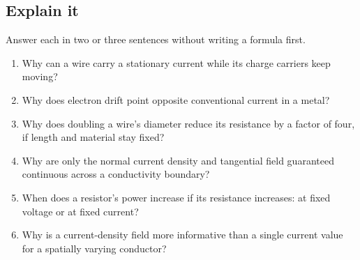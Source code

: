 \documentclass[11pt]{article}
\begin{document}
\begin{keepsection}
\section{Explain it}

Answer each in two or three sentences without writing a formula first.

\begin{enumerate}
\item Why can a wire carry a stationary current while its charge carriers keep moving?
\item Why does electron drift point opposite conventional current in a metal?
\item Why does doubling a wire’s diameter reduce its resistance by a factor of four, if length and material stay fixed?
\item Why are only the normal current density and tangential field guaranteed continuous across a conductivity boundary?
\item When does a resistor’s power increase if its resistance increases: at fixed voltage or at fixed current?
\item Why is a current-density field more informative than a single current value for a spatially varying conductor?
\end{enumerate}

\end{keepsection}

\clearpage
\end{document}
